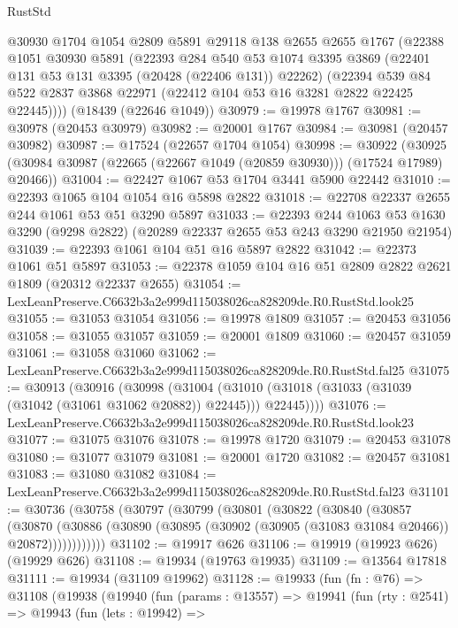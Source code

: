 \begin{lexlean}{RustStd}
\begin{coremodule}
    @30930
    @1704
    @1054
    @2809
    @5891
    @29118
    @138
    @2655
    @2655
    @1767
    (@22388
      @1051
      @30930
      @5891
      (@22393
        @284
        @540
        @53
        @1074
        @3395
        @3869
        (@22401 @131 @53 @131 @3395 (@20428 (@22406 @131)) @22262)
        (@22394 @539 @84 @522 @2837 @3868 @22971 (@22412 @104 @53 @16 @3281 @2822 @22425 @22445))))
    (@18439 (@22646 @1049))
@30979 := @19978 @1767
@30981 := @30978 (@20453 @30979)
@30982 := @20001 @1767
@30984 := @30981 (@20457 @30982)
@30987 := @17524 (@22657 @1704 @1054)
@30998 := @30922
    (@30925 (@30984 @30987 (@22665 (@22667 @1049 (@20859 @30930))) (@17524 @17989) @20466))
@31004 := @22427 @1067 @53 @1704 @3441 @5900 @22442
@31010 := @22393 @1065 @104 @1054 @16 @5898 @2822
@31018 := @22708 @22337 @2655 @244 @1061 @53 @51 @3290 @5897
@31033 := @22393
    @244
    @1063
    @53
    @1630
    @3290
    (@9298 @2822)
    (@20289 @22337 @2655 @53 @243 @3290 @21950 @21954)
@31039 := @22393 @1061 @104 @51 @16 @5897 @2822
@31042 := @22373 @1061 @51 @5897
@31053 := @22378 @1059 @104 @16 @51 @2809 @2822 @2621 @1809 (@20312 @22337 @2655)
@31054 := LexLeanPreserve.C6632b3a2e999d115038026ca828209de.R0.RustStd.look25
@31055 := @31053 @31054
@31056 := @19978 @1809
@31057 := @20453 @31056
@31058 := @31055 @31057
@31059 := @20001 @1809
@31060 := @20457 @31059
@31061 := @31058 @31060
@31062 := LexLeanPreserve.C6632b3a2e999d115038026ca828209de.R0.RustStd.fal25
@31075 := @30913
    (@30916
      (@30998
        (@31004 (@31010 (@31018 (@31033 (@31039 (@31042 (@31061 @31062 @20882)) @22445))) @22445))))
@31076 := LexLeanPreserve.C6632b3a2e999d115038026ca828209de.R0.RustStd.look23
@31077 := @31075 @31076
@31078 := @19978 @1720
@31079 := @20453 @31078
@31080 := @31077 @31079
@31081 := @20001 @1720
@31082 := @20457 @31081
@31083 := @31080 @31082
@31084 := LexLeanPreserve.C6632b3a2e999d115038026ca828209de.R0.RustStd.fal23
@31101 := @30736
    (@30758
      (@30797
        (@30799
          (@30801
            (@30822
              (@30840
                (@30857
                  (@30870
                    (@30886
                      (@30890 (@30895 (@30902 (@30905 (@31083 @31084 @20466)) @20872))))))))))))
@31102 := @19917 @626
@31106 := @19919 (@19923 @626) (@19929 @626)
@31108 := @19934 (@19763 @19935)
@31109 := @13564 @17818
@31111 := @19934 (@31109 @19962)
@31128 := @19933
    (fun (fn : @76) =>
    @31108
      (@19938
        (@19940
          (fun (params : @13557) =>
          @19941
            (fun (rty : @2541) =>
            @19943
              (fun (lets : @19942) =>

\end{coremodule}
\end{lexlean}

